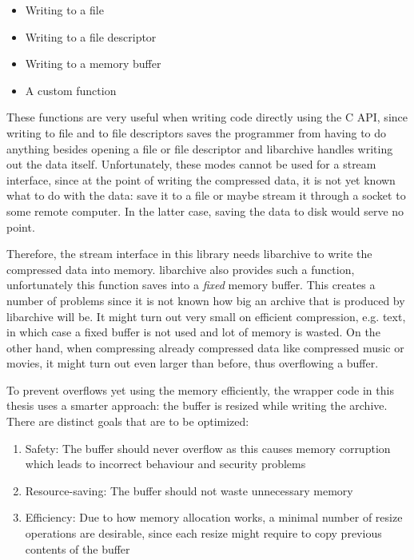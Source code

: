 \documentclass[parskip=half]{scrreprt}
\begin{document}
\begin{itemize}
  \item Writing to a file
  \item Writing to a file descriptor
  \item Writing to a memory buffer
  \item A custom function
\end{itemize}

These functions are very useful when writing code directly using the C API,
since writing to file and to file descriptors saves the programmer from having
to do anything besides opening a file or file descriptor and libarchive handles
writing out the data itself. Unfortunately, these modes cannot be used for a
stream interface, since at the point of writing the compressed data, it is not
yet known what to do with the data: save it to a file or maybe stream it
through a socket to some remote computer. In the latter case, saving the data
to disk would serve no point.

Therefore, the stream interface in this library needs libarchive to write the
compressed data into memory. libarchive also provides such a function,
unfortunately this function saves into a \emph{fixed} memory buffer. This
creates a number of problems since it is not known how big an archive that is
produced by libarchive will be. It might turn out very small on efficient
compression, e.g. text, in which case a fixed buffer is not used and lot of
memory is wasted. On the other hand, when compressing already compressed data
like compressed music or movies, it might turn out even larger than before,
thus overflowing a buffer.

To prevent overflows yet using the memory efficiently, the wrapper code in this
thesis uses a smarter approach: the buffer is resized while writing the
archive. There are distinct goals that are to be optimized:

\begin{enumerate}
  \item Safety: The buffer should never overflow as this causes memory
    corruption which leads to incorrect behaviour and security problems
  \item Resource-saving: The buffer should not waste unnecessary memory
  \item Efficiency: Due to how memory allocation works, a minimal number
    of resize operations are desirable, since each resize might require
    to copy previous contents of the buffer
\end{enumerate}
\end{document}
